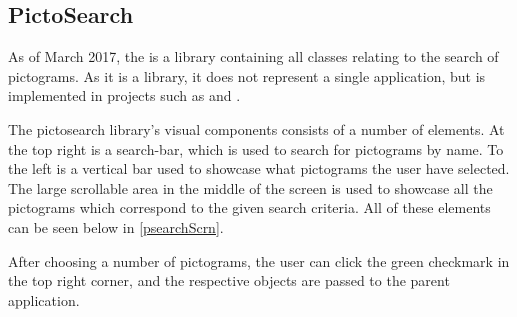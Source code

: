\subsection{PictoSearch}\label{PictoSearchReview}
As of March 2017, the  is a library containing all
classes relating to the search of pictograms. As it is a library, it does not
represent a single application, but is implemented in projects such as
 and .\nl

The pictosearch library's visual components consists of a number of
elements. At the top right is a search-bar, which is used to search for
pictograms by name. To the left is a vertical bar used to showcase what
pictograms the user have selected. The large scrollable area in the middle of
the screen is used to showcase all the pictograms which correspond to the given
search criteria. All of these elements can be seen below in
\autoref{psearchScrn}.
 

After choosing a number of pictograms, the user can click the green checkmark in
the top right corner, and the respective  objects are passed to
the parent application.